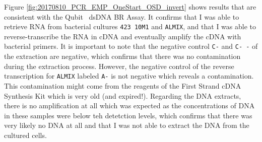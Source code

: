 Figure \ref{fig:20170810_PCR_EMP_OneStart_OSD_invert} shows results that are consistent with the Qubit\texttrademark~ dsDNA BR Assay. It confirms that I was able to retrieve RNA from bacterial cultures {\color{Lavender} \texttt{423 10M1}} and {\color{Rose} \texttt{ALMIX}}, and that I was able to reverse-transcribe the RNA in cDNA and eventually amplify the cDNA with bacterial primers. It is important to note that the negative control {\color{Aqua} \texttt{C-}} and {\color{Aqua} \texttt{C-~-}} of the extraction are negative, which confirms that there was no contamination during the extraction process. However, the negative control of the reverse transcription for {\color{Rose} \texttt{ALMIX}} labeled \texttt{A-} is not negative which reveals a contamination. This contamination might come from the reagents of the First Strand cDNA Synthesis Kit which is very old (and expired!). Regarding the DNA extracts, there is no amplification at all which was expected as the concentrations of DNA in these samples were below teh detetction levels, which confirms that there was very likely no DNA at all and that I was not able to extract the DNA from the cultured cells.
